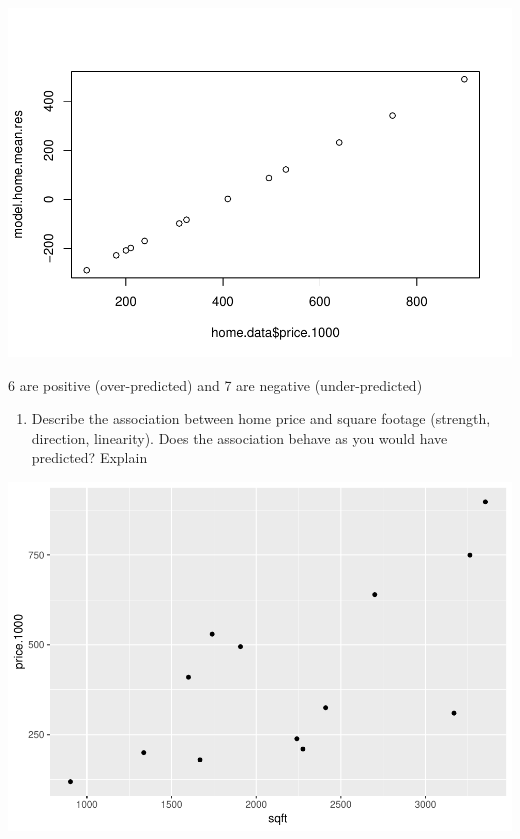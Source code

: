 \documentclass[]{article}
\newenvironment{Shaded}{\begin{snugshade}}{\end{snugshade}}
\newcommand{\KeywordTok}[1]{\textcolor[rgb]{0.13,0.29,0.53}{\textbf{#1}}}
\newcommand{\DataTypeTok}[1]{\textcolor[rgb]{0.13,0.29,0.53}{#1}}
\newcommand{\DecValTok}[1]{\textcolor[rgb]{0.00,0.00,0.81}{#1}}
\newcommand{\StringTok}[1]{\textcolor[rgb]{0.31,0.60,0.02}{#1}}
\newcommand{\OperatorTok}[1]{\textcolor[rgb]{0.81,0.36,0.00}{\textbf{#1}}}
\newcommand{\NormalTok}[1]{#1}
\providecommand{\tightlist}{%
  \setlength{\itemsep}{0pt}\setlength{\parskip}{0pt}}
\begin{document}
\includegraphics{Michigan_Home_Prices_files/figure-latex/unnamed-chunk-5-1.pdf}

6 are positive (over-predicted) and 7 are negative (under-predicted)

\begin{enumerate}
\def\labelenumi{\arabic{enumi}.}
\setcounter{enumi}{9}
\tightlist
\item
  Describe the association between home price and square footage
  (strength, direction, linearity). Does the association behave as you
  would have predicted? Explain
\end{enumerate}

\begin{Shaded}
\end{Shaded}

\includegraphics{Michigan_Home_Prices_files/figure-latex/unnamed-chunk-6-1.pdf}
\end{document}
